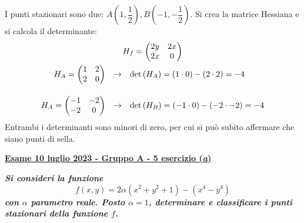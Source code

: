 \documentclass[a4paper]{article}
\makeatletter
\newcommand{\definition}[1]{\textcolor{Red3}{\textbf{#1}}}
\newcommand{\example}[1]{\textcolor{Green4}{\textbf{#1}}}
\newenvironment{rowequmat}[1]{\left(\array{@{}#1@{}}}{\endarray\right)}
\makeatother
\begin{document}
	I punti stazionari sono due: $A\left(1, \dfrac{1}{2}\right), B\left(-1, -\dfrac{1}{2}\right)$. Si crea la matrice Hessiana e si calcola il determinante:
	\begin{gather*}
		H_{f} = \begin{rowequmat}{c c}
			2y & 2x \\
			2x & 0
		\end{rowequmat}
		\\
		\begin{array}{rcl}
			H_{A} = \begin{rowequmat}{c c}
				1 & 2 \\
				2 & 0
			\end{rowequmat} & \rightarrow & \det\left(H_{A}\right) = \left(1 \cdot 0\right) - \left(2 \cdot 2\right) = -4 \\ [2em]
			H_{A} = \begin{rowequmat}{c c}
				-1 & -2 \\
				-2 &  0
			\end{rowequmat} & \rightarrow & \det\left(H_{B}\right) = \left(-1 \cdot 0\right) - \left(-2 \cdot -2\right) = -4
		\end{array}
	\end{gather*}
	Entrambi i determinanti sono minori di zero, per cui si può subito affermare che siano punti di sella.

	\newpage

	\begin{flushleft}
		\label{exam: esame 10 luglio 2023 - Gruppo A - 5 esercizio (a)}
		\hypertarget{
			exam: esame 10 luglio 2023 - Gruppo A - 5 esercizio (a)
		}{
			\definition{\underline{Esame 10 luglio 2023 - Gruppo A - 5 esercizio (\emph{a})}}
		}
	\end{flushleft}
	\example{\emph{Si consideri la funzione}
	\begin{equation*}
		f\left(x,y\right) = 2\alpha\left(x^{2}+y^{2}+1\right) - \left(x^{4}-y^{4}\right)
	\end{equation*}
	\emph{con $\alpha$ parametro reale. Posto $\alpha = 1$, determinare e classificare i punti stazionari della funzione $f$.}}\newline
\end{document}
